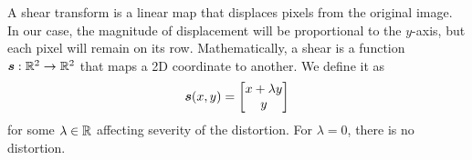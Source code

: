 \documentclass[../report.tex]{subfiles}
\begin{document}
A shear transform is a linear map that displaces pixels from the original image. 
In our case, the magnitude of displacement will be proportional to the $y$-axis, but each pixel will remain on its row.
Mathematically, a shear is a function ${\bm{s}} : \mathbb{R}^2 \to \mathbb{R}^2$ that maps a 2D coordinate to another.
We define it as
\begin{equation}
    {\bm{s}}(x,y) = \begin{bmatrix}
        x + \lambda y \\ y
    \end{bmatrix}
\end{equation}
for some $\lambda \in \mathbb{R}$ affecting severity of the distortion.
For $\lambda=0$, there is no distortion.
\begin{figure}
    \centering
    \begin{subfigure}[b]{0.47\textwidth}
\end{subfigure}
\end{figure}
\end{document}
